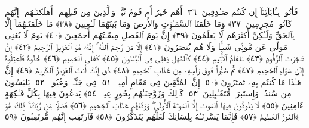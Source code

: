  فَأتُوا۟ بِـَٔابَآئِنَآ إِن كُنتُم صَـٰدِقِينَ ﴿٣٦﴾
 أَهُم خَيرٌ أَم قَومُ تُبَّعٍۢ وَٱلَّذِينَ مِن قَبلِهِم ۚ أَهلَكنَـٰهُم ۖ إِنَّهُم كَانُوا۟ مُجرِمِينَ ﴿٣٧﴾
 وَمَا خَلَقنَا ٱلسَّمَـٰوَٟتِ وَٱلأَرضَ وَمَا بَينَهُمَا لَـٰعِبِينَ ﴿٣٨﴾
 مَا خَلَقنَـٰهُمَآ إِلَّا بِٱلحَقِّ وَلَـٰكِنَّ أَكثَرَهُم لَا يَعلَمُونَ ﴿٣٩﴾
 إِنَّ يَومَ ٱلفَصلِ مِيقَـٰتُهُم أَجمَعِينَ ﴿٤٠﴾
 يَومَ لَا يُغنِى مَولًى عَن مَّولًۭى شَيـًۭٔا وَلَا هُم يُنصَرُونَ ﴿٤١﴾
 إِلَّا مَن رَّحِمَ ٱللَّهُ ۚ إِنَّهُۥ هُوَ ٱلعَزِيزُ ٱلرَّحِيمُ ﴿٤٢﴾
 إِنَّ شَجَرَتَ ٱلزَّقُّومِ ﴿٤٣﴾
 طَعَامُ ٱلأَثِيمِ ﴿٤٤﴾
 كَٱلمُهلِ يَغلِى فِى ٱلبُطُونِ ﴿٤٥﴾
 كَغَلىِ ٱلحَمِيمِ ﴿٤٦﴾
 خُذُوهُ فَٱعتِلُوهُ إِلَىٰ سَوَآءِ ٱلجَحِيمِ ﴿٤٧﴾
 ثُمَّ صُبُّوا۟ فَوقَ رَأسِهِۦ مِن عَذَابِ ٱلحَمِيمِ ﴿٤٨﴾
 ذُق إِنَّكَ أَنتَ ٱلعَزِيزُ ٱلكَرِيمُ ﴿٤٩﴾
 إِنَّ هَـٰذَا مَا كُنتُم بِهِۦ تَمتَرُونَ ﴿٥٠﴾
 إِنَّ ٱلمُتَّقِينَ فِى مَقَامٍ أَمِينٍۢ ﴿٥١﴾
 فِى جَنَّـٰتٍۢ وَعُيُونٍۢ ﴿٥٢﴾
 يَلبَسُونَ مِن سُندُسٍۢ وَإِستَبرَقٍۢ مُّتَقَـٰبِلِينَ ﴿٥٣﴾
 كَذَٟلِكَ وَزَوَّجنَـٰهُم بِحُورٍ عِينٍۢ ﴿٥٤﴾
 يَدعُونَ فِيهَا بِكُلِّ فَـٰكِهَةٍ ءَامِنِينَ ﴿٥٥﴾
 لَا يَذُوقُونَ فِيهَا ٱلمَوتَ إِلَّا ٱلمَوتَةَ ٱلأُولَىٰ ۖ وَوَقَىٰهُم عَذَابَ ٱلجَحِيمِ ﴿٥٦﴾
 فَضلًۭا مِّن رَّبِّكَ ۚ ذَٟلِكَ هُوَ ٱلفَوزُ ٱلعَظِيمُ ﴿٥٧﴾
 فَإِنَّمَا يَسَّرنَـٰهُ بِلِسَانِكَ لَعَلَّهُم يَتَذَكَّرُونَ ﴿٥٨﴾
 فَٱرتَقِب إِنَّهُم مُّرتَقِبُونَ ﴿٥٩﴾
 

